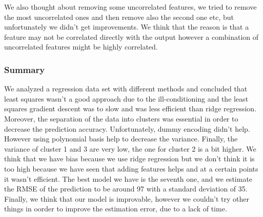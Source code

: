 \documentclass{article} %
\begin{document}
We also thought about removing some uncorrelated features, we tried to remove the most uncorrelated ones and then remove also the second one etc, but unfortunately we didn't get improvements. We think that the reason is that a feature may not be correlated directly with the output however a combination of uncorrelated features might be highly correlated. 

\subsubsection{Summary}

We analyzed a regression data set with different methods and concluded that least squares wasn't a good approach due to the ill-conditioning and the least squares gradient descent was to slow and was less efficient than ridge regression. Moreover, the separation of the data into clusters was essential in order to decrease the prediction accuracy. Unfortunately, dummy encoding didn't help. However using polynomial basis help to decrease the variance. Finally, the variance of cluster 1 and 3 are very low, the one for cluster 2 is a bit higher. We think that we have bias because we use ridge regression but we don't think it is too high because we have seen that adding features helps and at a certain points it wasn't efficient. The best model we have is the seventh one, and we estimate the RMSE of the prediction to be around 97 with a standard deviation of 35. Finally, we think that our model is improvable, however we couldn't try other things in oorder to improve the estimation error, due to a lack of time.
\end{document}
